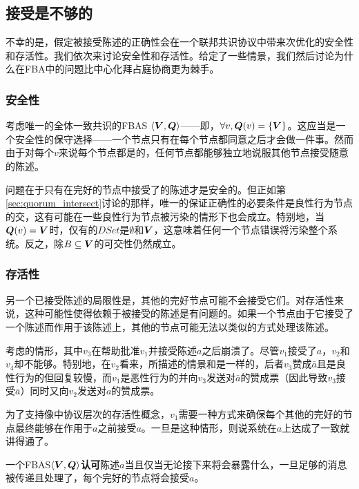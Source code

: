 \subsection{接受是不够的}
不幸的是，假定被接受陈述的正确性会在一个联邦共识协议中带来次优化的安全性和存活性。我们依次来讨论安全性和存活性。给定了一些情景，我们然后讨论为什么在FBA中的问题比中心化拜占庭协商更为棘手。

\subsubsection{安全性}\label{sec:voting_safety}
考虑唯一的{\quorum}全体一致共识的FBAS $\langle{\bm V},{\bm Q}\rangle$——即，$\forall v, {\bm Q}(v)=\left\{{\bm V}\right\}$。这应当是一个安全性的保守选择——一个节点只有在每个节点都同意之后才会做一件事。然而由于对每个$v$来说每个节点都是{\vblock}的，任何节点都能够独立地说服其他节点接受随意的陈述。

问题在于只有在完好的节点中接受了的陈述才是安全的。但正如第\ref{sec:quorum_intersect}讨论的那样，唯一的保证正确性的必要条件是良性行为节点的{\quorum}交，这有可能在一些良性行为节点被污染的情形下也会成立。特别地，当${\bm Q}(v)={\bm V}$时，仅有的$DSet$是$\emptyset$和${\bm V}$，这意味着任何一个节点错误将污染整个系统。反之，除$B\subseteq{\bm V}$的{\quorum}可交性仍然成立。

\subsubsection{存活性}
另一个已接受陈述的局限性是，其他的完好节点可能不会接受它们。对存活性来说，这种可能性使得依赖于被接受的陈述是有问题的。如果一个节点由于它接受了一个陈述而作用于该陈述上，其他的节点可能无法以类似的方式处理该陈述。

考虑的情形，其中$v_3$在帮助批准$v_1$并接受陈述$a$之后崩溃了。尽管$v_1$接受了$a$，$v_2$和$v_4$却不能够。特别地，在$v_2$看来，所描述的情景和是一样的，后者$v_3$赞成$\bar a$且是良性行为的但回复较慢，而$v_1$是恶性行为的并向$v_3$发送对$\bar a$的赞成票（因此导致$v_3$接受$\bar a$）同时又向$v_2$发送对$a$的赞成票。

为了支持像中协议层次的存活性概念，$v_1$需要一种方式来确保每个其他的完好的节点最终能够在作用于$a$之前接受$a$。一旦是这种情形，则说系统在$a$上达成了一致就讲得通了。

\begin{definition}[认可]\label{def:agree}
	一个FBAS$\langle{\bm V},{\bm Q}\rangle$\textbf{认可}陈述$a$当且仅当无论接下来将会暴露什么，一旦足够的消息被传递且处理了，每个完好的节点将会接受$a$。
\end{definition}

